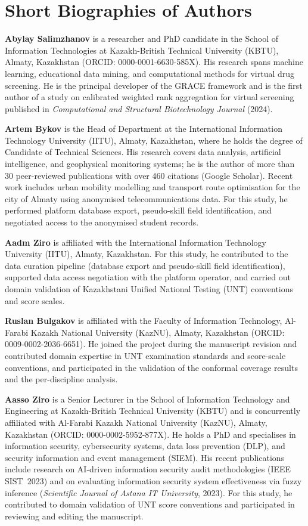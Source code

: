 \documentclass[11pt]{article}
\begin{document}
\section*{Short Biographies of Authors}

\textbf{Abylay Salimzhanov} is a researcher and PhD candidate in the School of
Information Technologies at Kazakh-British Technical University (KBTU), Almaty,
Kazakhstan (ORCID: 0000-0001-6630-585X).
His research spans machine learning, educational data mining, and computational
methods for virtual drug screening.
He is the principal developer of the GRACE framework and is the first author of
a study on calibrated weighted rank aggregation for virtual screening published
in \textit{Computational and Structural Biotechnology Journal} (2024).

\textbf{Artem Bykov} is the Head of Department at the International Information
Technology University (IITU), Almaty, Kazakhstan, where he holds the degree of
Candidate of Technical Sciences.
His research covers data analysis, artificial intelligence, and geophysical
monitoring systems; he is the author of more than 30 peer-reviewed publications
with over 460 citations (Google Scholar).
Recent work includes urban mobility modelling and transport route optimisation
for the city of Almaty using anonymised telecommunications data.
For this study, he performed platform database export, pseudo-skill field
identification, and negotiated access to the anonymised student records.

\textbf{Aadm Ziro} is affiliated with the International Information Technology
University (IITU), Almaty, Kazakhstan.
For this study, he contributed to the data curation pipeline (database export
and pseudo-skill field identification), supported data access negotiation with
the platform operator, and carried out domain validation of Kazakhstani Unified
National Testing (UNT) conventions and score scales.

\textbf{Ruslan Bulgakov} is affiliated with the Faculty of Information
Technology, Al-Farabi Kazakh National University (KazNU), Almaty, Kazakhstan
(ORCID: 0009-0002-2036-6651).
He joined the project during the manuscript revision and contributed domain
expertise in UNT examination standards and score-scale conventions, and
participated in the validation of the conformal coverage results and the
per-discipline analysis.

\textbf{Aasso Ziro} is a Senior Lecturer in the School of Information Technology
and Engineering at Kazakh-British Technical University (KBTU) and is concurrently
affiliated with Al-Farabi Kazakh National University (KazNU), Almaty, Kazakhstan
(ORCID: 0000-0002-5952-877X).
He holds a PhD and specialises in information security, cybersecurity systems,
data loss prevention (DLP), and security information and event management (SIEM).
His recent publications include research on AI-driven information security audit
methodologies (IEEE SIST~2023) and on evaluating information security system
effectiveness via fuzzy inference (\textit{Scientific Journal of Astana IT
University}, 2023).
For this study, he contributed to domain validation of UNT score conventions and
participated in reviewing and editing the manuscript.
\end{document}

